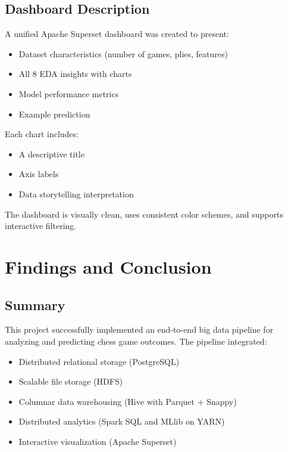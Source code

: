 \documentclass[12pt,a4paper]{article}
\begin{document}
\subsection{Dashboard Description}

A unified Apache Superset dashboard was created to present:

\begin{itemize}
    \item Dataset characteristics (number of games, plies, features)
    \item All 8 EDA insights with charts
    \item Model performance metrics
    \item Example prediction
\end{itemize}

Each chart includes:

\begin{itemize}
    \item A descriptive title
    \item Axis labels
    \item Data storytelling interpretation
\end{itemize}

The dashboard is visually clean, uses consistent color schemes, and supports interactive filtering.

\section{Findings and Conclusion}

\subsection{Summary}

This project successfully implemented an end-to-end big data pipeline for analyzing and predicting chess game outcomes. The pipeline integrated:

\begin{itemize}
    \item Distributed relational storage (PostgreSQL)
    \item Scalable file storage (HDFS)
    \item Columnar data warehousing (Hive with Parquet + Snappy)
    \item Distributed analytics (Spark SQL and MLlib on YARN)
    \item Interactive visualization (Apache Superset)
\end{itemize}
\end{document}

